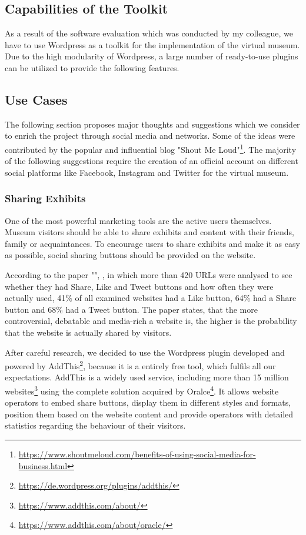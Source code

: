 \subsection{Capabilities of the Toolkit}

As a result of the software evaluation which was conducted by my colleague, we have to use Wordpress as a toolkit for the implementation of the virtual museum. Due to the high modularity of Wordpress, a large number of ready-to-use plugins can be utilized to provide the following features.


\subsection{Use Cases}
The following section proposes major thoughts and suggestions which we consider to enrich the project through social media and networks. Some of the ideas were contributed by the popular and influential blog "Shout Me Loud"\footnote{\url{https://www.shoutmeloud.com/benefits-of-using-social-media-for-business.html}}. The majority of the following suggestions require the creation of an official account on different social platforms like Facebook, Instagram and Twitter for the virtual museum.


\subsubsection{Sharing Exhibits} \label{social_sharing}

One of the most powerful marketing tools are the active users themselves. Museum visitors should be able to share exhibits and content with their friends, family or acquaintances. To encourage users to share exhibits and make it as easy as possible, social sharing buttons should be provided on the website.

According to the paper "", \cite[pp. 11--18]{LikeShare}, in which more than 420 URLs were analysed to see whether they had Share, Like and Tweet buttons and how often they were actually used, 41\% of all examined websites had a Like button, 64\% had a Share button and 68\% had a Tweet button. The paper states, that the more controversial, debatable and media-rich a website is, the higher is the probability that the website is actually shared by visitors.

After careful research, we decided to use the Wordpress plugin developed and powered by AddThis\footnote{\url{https://de.wordpress.org/plugins/addthis/}}, because it is a entirely free tool, which fulfils all our expectations. AddThis is a widely used service, including more than 15 million websites\footnote{\url{https://www.addthis.com/about/}} using the complete solution acquired by Oralce\footnote{\url{https://www.addthis.com/about/oracle/}}. It allows website operators to embed share buttons, display them in different styles and formats, position them based on the website content and provide operators with detailed statistics regarding the behaviour of their visitors.

